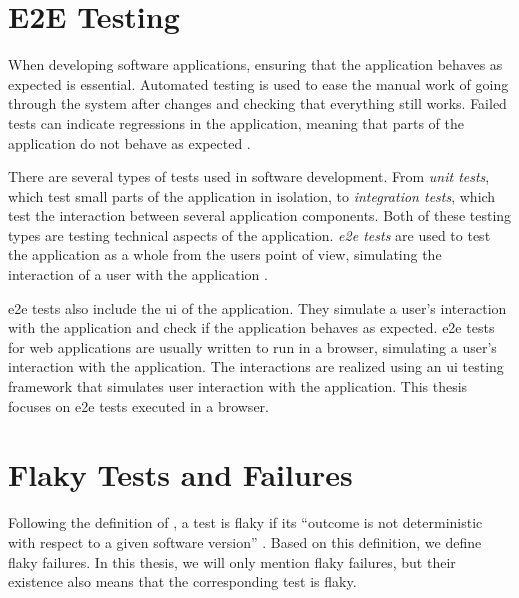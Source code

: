 \section{E2E Testing}

When developing software applications, ensuring that the application behaves as expected is essential.
Automated testing is used to ease the manual work of going through the system after changes and checking that everything still works.
Failed tests can indicate regressions in the application, meaning that parts of the application do not behave as expected \autocite{lam_large-scale_2020, luo_empirical_2014,romano_empirical_2021}.

There are several types of tests used in software development.
From \emph{unit tests}, which test small parts of the application in isolation, to \emph{integration tests}, which test the interaction between several application components.
Both of these testing types are testing technical aspects of the application.
\emph{\ac{e2e} tests} are used to test the application as a whole from the users point of view, simulating the interaction of a user with the application \autocite{jacob_schmitt_what_2022}.

\Ac{e2e} tests also include the \ac{ui} of the application.
They simulate a user's interaction with the application and check if the application behaves as expected.
\ac{e2e} tests for web applications are usually written to run in a browser, simulating a user's interaction with the application.
The interactions are realized using an \ac{ui} testing framework that simulates user interaction with the application.
This thesis focuses on \ac{e2e} tests executed in a browser.


\section{Flaky Tests and Failures}

Following the definition of \citeauthor*{luo_empirical_2014} \autocite{luo_empirical_2014}, a test is flaky if its \enquote{outcome is not deterministic with respect to a given software version} \autocite{luo_empirical_2014}.
Based on this definition, we define flaky failures.
In this thesis, we will only mention flaky failures, but their existence also means that the corresponding test is flaky.

